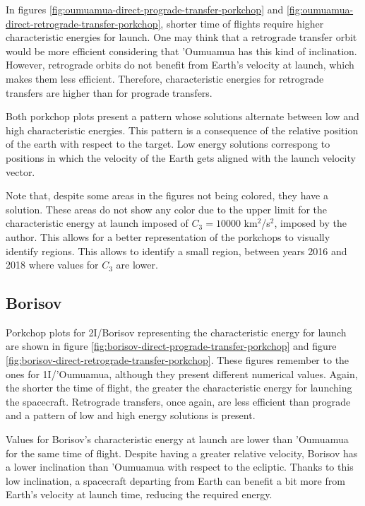 In figures \ref{fig:oumuamua-direct-prograde-transfer-porkchop} and
\ref{fig:oumuamua-direct-retrograde-transfer-porkchop}, shorter time of flights
require higher characteristic energies for launch. One may think that a
retrograde transfer orbit would be more efficient considering that 'Oumuamua has
this kind of inclination. However, retrograde orbits do not benefit from Earth's
velocity at launch, which makes them less efficient. Therefore, characteristic
energies for retrograde transfers are higher than for prograde transfers.

Both porkchop plots present a pattern whose solutions alternate between low and
high characteristic energies. This pattern is a consequence of the relative
position of the earth with respect to the target. Low energy solutions
correspong to positions in which the velocity of the Earth gets aligned with the
launch velocity vector.

Note that, despite some areas in the figures not being colored, they have a
solution. These areas do not show any color due to the upper limit for the characteristic
energy at launch imposed of $C_3 = 10000$ km$^2$/s$^2$, imposed by the
author. This allows for a better representation of the porkchops to visually
identify regions. This allows to identify a small region, between years 2016 and
2018 where values for $C_3$ are lower.

\subsection{Borisov}

Porkchop plots for 2I/Borisov representing the characteristic energy for launch
are shown in figure \ref{fig:borisov-direct-prograde-transfer-porkchop} and
figure \ref{fig:borisov-direct-retrograde-transfer-porkchop}. These figures
remember to the ones for 1I/'Oumuamua, although they present different numerical
values. Again, the shorter the time of flight, the greater the characteristic
energy for launching the spacecraft. Retrograde transfers, once again, are less
efficient than prograde and a pattern of low and high energy solutions is
present.

Values for Borisov's characteristic energy at launch are lower than 'Oumuamua
for the same time of flight. Despite having a greater relative velocity, Borisov
has a lower inclination than 'Oumuamua with respect to the ecliptic. Thanks to
this low inclination, a spacecraft departing from Earth can benefit a bit more
from Earth's velocity at launch time, reducing the required energy.


